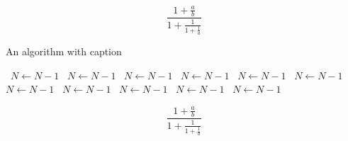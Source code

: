 \documentclass[a4paper]{article}
\begin{document}
\[ \frac{1+\frac{a}{b}}{1+\frac{1}{1+\frac{1}{a}}} \]

\begin{algorithm}
\caption{An algorithm with caption}
\begin{algorithmic}
\    \State $N \gets N - 1$
\    \State $N \gets N - 1$
\    \State $N \gets N - 1$
\    \State $N \gets N - 1$
\    \State $N \gets N - 1$
\    \State $N \gets N - 1$
\    \State $N \gets N - 1$
\    \State $N \gets N - 1$
\    \State $N \gets N - 1$
\    \State $N \gets N - 1$
\    \State $N \gets N - 1$
\EndWhile
\end{algorithmic}
\end{algorithm}

\[ \frac{1+\frac{a}{b}}{1+\frac{1}{1+\frac{1}{a}}} \]
\end{document}
